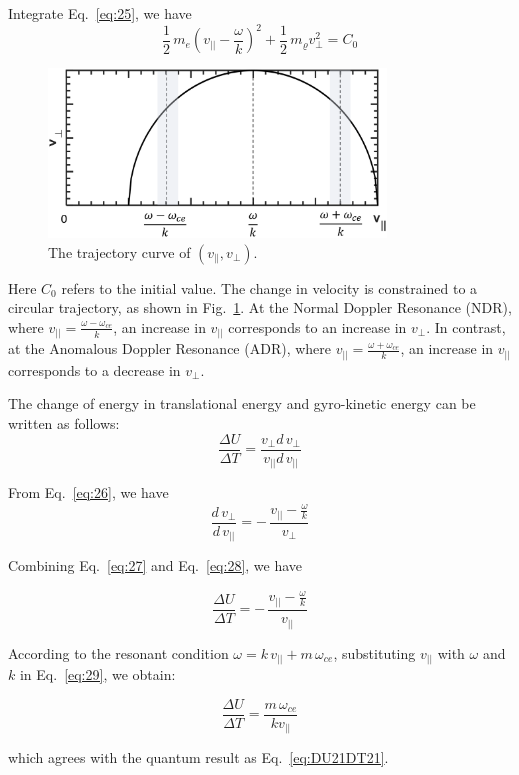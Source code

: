 \documentclass{cpbtex3}
\begin{document}
Integrate Eq.~\eqref{eq:25}, we have
\begin{equation}
\frac{1}{2}\,m_e\left(v_{||}-\frac{\omega}{k}\right)^{2}+\frac{1}{2}\,m_{\varrho}v_{\perp}^{2}=C_{0}
\label{eq:26}
\end{equation}
\begin{figure}[htbp]
\centering
\includegraphics[width=0.8\textwidth]{Figure8.eps}%
\caption{\label{fig:8}The trajectory curve of $ (v_\parallel,v_\perp)$.}
\end{figure}
Here $C_{0}$ refers to the initial value. The change in velocity is constrained to a circular trajectory, as shown in Fig.~\ref{fig:8}. At the Normal Doppler Resonance (NDR), where $v_{||}=\frac{\omega-\omega_{ce}}{k}$, an increase in $v_{||}$ corresponds to an increase in $v_{\perp}$. In contrast, at the Anomalous Doppler Resonance (ADR), where $v_{||}=\frac{\omega+\omega_{ce}}{k}$, an increase in $v_{||}$ corresponds to a decrease in $v_{\perp}$.

The change of energy in translational energy and gyro-kinetic energy can be written as follows:
\begin{equation}
\frac{\Delta U}{\Delta T}=\frac{v_{\perp}d\,v_{\perp}}{v_{||}d\,v_{||}}
\label{eq:27}
\end{equation}

From Eq.~\eqref{eq:26}, we have
\begin{equation}
\frac{d\,v_{\perp}}{d\,v_{||}}=-\,\frac{v_{||}-\frac{\omega}{k}}{v_{\perp}}
\label{eq:28}
\end{equation}

Combining Eq.~\eqref{eq:27} and Eq.~\eqref{eq:28}, we have

\begin{equation}
\frac{\Delta U}{\Delta T}=-\,\frac{v_{||}-\frac{\omega}{k}}{v_{||}}
\label{eq:29}
\end{equation}

According to the resonant condition $\omega=k\,v_{||}+m\,\omega_{ce}$, substituting $v_{||}$ with $\omega$ and $k$ in Eq.~\eqref{eq:29}, we obtain:

\begin{equation}
\frac{\Delta U}{\Delta T}=\frac{m\,\omega_{ce}}{kv_{||}}
\label{eq:30}
\end{equation}

which agrees with the quantum result as Eq.~\ref{eq:DU21DT21}.






\end{document}
